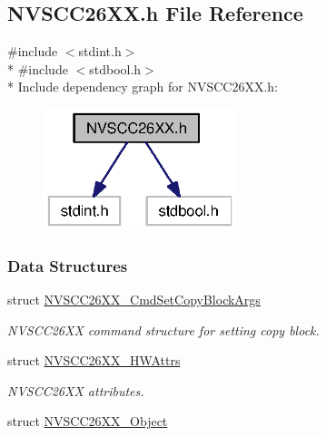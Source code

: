 \subsection{N\+V\+S\+C\+C26\+X\+X.\+h File Reference}
\label{_n_v_s_c_c26_x_x_8h}
{\ttfamily \#include $<$stdint.\+h$>$}\\*
{\ttfamily \#include $<$stdbool.\+h$>$}\\*
Include dependency graph for N\+V\+S\+C\+C26\+X\+X.\+h\+:
\nopagebreak
\begin{figure}[H]
\begin{center}
\leavevmode
\includegraphics[width=159pt]{_n_v_s_c_c26_x_x_8h__incl}
\end{center}
\end{figure}
\subsubsection*{Data Structures}
\begin{DoxyCompactItemize}
\item 
struct \hyperlink{struct_n_v_s_c_c26_x_x___cmd_set_copy_block_args}{N\+V\+S\+C\+C26\+X\+X\+\_\+\+Cmd\+Set\+Copy\+Block\+Args}
\begin{DoxyCompactList}\small\item\em N\+V\+S\+C\+C26\+X\+X command structure for setting copy block. \end{DoxyCompactList}\item 
struct \hyperlink{struct_n_v_s_c_c26_x_x___h_w_attrs}{N\+V\+S\+C\+C26\+X\+X\+\_\+\+H\+W\+Attrs}
\begin{DoxyCompactList}\small\item\em N\+V\+S\+C\+C26\+X\+X attributes. \end{DoxyCompactList}\item 
struct \hyperlink{struct_n_v_s_c_c26_x_x___object}{N\+V\+S\+C\+C26\+X\+X\+\_\+\+Object}
\end{DoxyCompactItemize}

